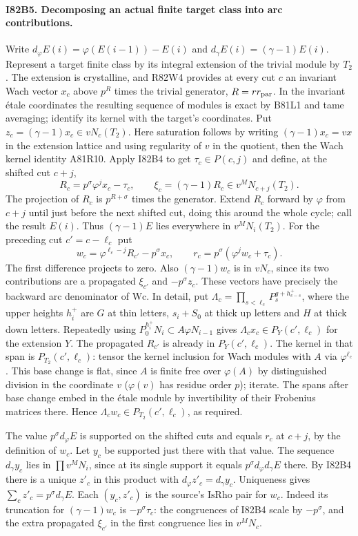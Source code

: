\paragraph{I82B5. Decomposing an actual finite target class into arc contributions.}
Write $d_\varphi E(i)=\varphi(E(i-1))-E(i)$ and
$d_\gamma E(i)=(\gamma-1)E(i)$. Represent a target finite class
by its integral extension of the trivial module by $T_2$.
The extension is crystalline, and R82W4 provides at every cut
$c$ an invariant Wach vector $x_c$ above $p^R$ times the
trivial generator, $R=rr_{\rm par}$. In the invariant \'etale
coordinates the resulting sequence of modules is exact by
B81L1 and tame averaging; identify its kernel with the target's
coordinates. Put $z_c=(\gamma-1)x_c\in vN_c(T_2)$.
Here saturation follows by writing $(\gamma-1)x_c=vx$ in the
extension lattice and using regularity of $v$ in the quotient,
then the Wach kernel identity A81R10. Apply I82B4 to get
$\tau_c\in P(c,j)$ and define, at the shifted cut $c+j$,
\[
 R_c=p^\sigma\varphi^j x_c-\tau_c,\qquad
 \xi_c=(\gamma-1)R_c\in v^MN_{c+j}(T_2).
\]
The projection of $R_c$ is $p^{R+\sigma}$ times the generator.
Extend $R_c$ forward by $\varphi$ from $c+j$ until just before
the next shifted cut, doing this around the whole cycle; call the
result $E(i)$. Thus $(\gamma-1)E$ lies everywhere in $v^MN_i(T_2)$.
For the preceding cut $c'=c-\ell_c$ put
\[
 w_c=\varphi^{\ell_c-j} R_{c'}-p^\sigma x_c,\qquad
 r_c=p^\sigma(\varphi^j w_c+\tau_c).
\]
The first difference projects to zero. Also $(\gamma-1)w_c$
is in $vN_c$, since its two contributions are a propagated
$\xi_{c'}$ and $-p^\sigma z_c$. These vectors have precisely the
backward arc denominator of $\mathrm{Wc}$. In detail, put
$\Lambda_c=\prod_{s<\ell_c}P_s^{g+h_{c-s}^{+}}$, where the
upper heights $h_i^{+}$ are $G$ at thin letters, $s_i+S_0$
at thick up letters and $H$ at thick down letters. Repeatedly
using $P_0^{h_i^{+}}N_i\subset A\varphi N_{i-1}$ gives
$\Lambda_c x_c\in P_Y(c',\ell_c)$ for the extension $Y$.
The propagated $R_{c'}$ is already in $P_Y(c',\ell_c)$.
The kernel in that span is $P_{T_2}(c',\ell_c)$: tensor the
kernel inclusion for Wach modules with $A$ via $\varphi^{\ell_c}$.
This base change is flat, since $A$ is finite free over
$\varphi(A)$ by distinguished division in the coordinate $v$
($\varphi(v)$ has residue order $p$); iterate. The spans after
base change embed in the \'etale module by invertibility of
their Frobenius matrices there. Hence
$\Lambda_c w_c\in P_{T_2}(c',\ell_c)$, as required.

The value $p^\sigma d_\varphi E$ is supported on the shifted cuts
and equals $r_c$ at $c+j$, by the definition of $w_c$.
Let $y_c$ be supported just there with that value. The sequence
$d_\gamma y_c$ lies in $\prod v^M N_i$, since at its single
support it equals
$p^\sigma d_\varphi d_\gamma E$ there. By I82B4 there is a
unique $z'_c$ in this product with $d_\varphi z'_c=d_\gamma y_c$.
Uniqueness gives $\sum_c z'_c=p^\sigma d_\gamma E$.
Each $(y_c,z'_c)$ is the source's $\mathrm{IsRho}$ pair for
$w_c$. Indeed its truncation for $(\gamma-1)w_c$ is
$-p^\sigma\tau_c$: the congruences of I82B4 scale by $-p^\sigma$,
and the extra propagated $\xi_{c'}$ in the first congruence
lies in $v^MN_c$.

